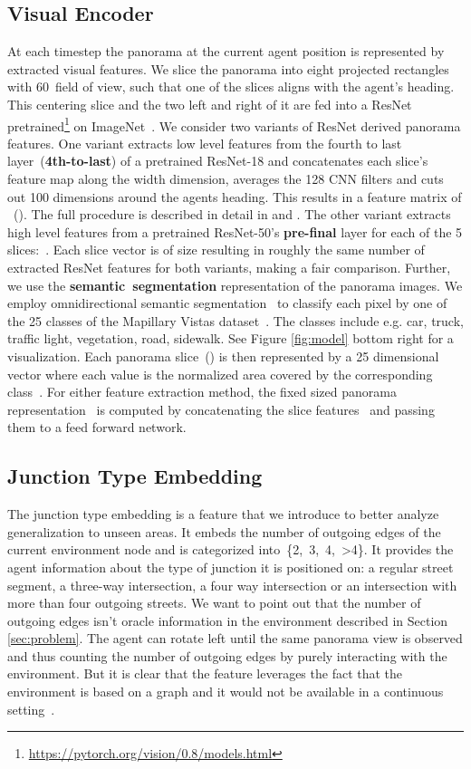 \documentclass[11pt]{article}
\begin{document}
\subsection{Visual Encoder}
At each timestep  the panorama at the current agent position is represented by
extracted visual features. We slice the panorama into eight projected rectangles with 60\degree~field of view, such that one of the slices aligns with the agent's heading. This centering slice and the two left and right of it are fed into a ResNet pretrained\footnote{\url{https://pytorch.org/vision/0.8/models.html}} on ImageNet~\cite{imagenet}. We consider two variants of ResNet derived panorama features. One variant extracts low level features from the fourth to last layer~(\textbf{4th-to-last}) of a pretrained ResNet-18 and concatenates each slice's feature map along the width dimension, averages the 128 CNN filters and cuts out 100 dimensions around the agents heading. This results in a feature matrix of ~(). The full procedure is described in detail in \citet{Chen2018Touchdown} and \citet{Zhu2020MultimodalNavigation}. The other variant extracts high level features from a pretrained \mbox{ResNet-50's} \textbf{pre-final} layer for each of the 5 slices:~. Each slice vector  is of size  resulting in roughly the same number of extracted ResNet features for both variants, making a fair comparison. Further, we use the \textbf{semantic~segmentation} representation of the panorama images. We employ omnidirectional semantic segmentation~\cite{yang2020omnisupervised} to classify each pixel by one of the 25 classes of the Mapillary Vistas dataset~\cite{mapillary}. The classes include e.g. car, truck, traffic light, vegetation, road, sidewalk. See Figure \ref{fig:model} bottom right for a visualization. Each panorama slice~() is then represented by a 25 dimensional vector where each value is the normalized area covered by the corresponding class~\cite{Zhang2020DiagnosingNavigation}. For either feature extraction method, the fixed sized panorama representation~ is computed by concatenating the slice features~ and passing them to a feed forward network.

\subsection{Junction Type Embedding}
\label{sec:junction}
The junction type embedding is a feature that we introduce to better analyze generalization to unseen areas. It embeds the number of outgoing edges of the current environment node and is categorized into~\{2,~3,~4,~\textgreater4\}. It provides the agent information about the type of junction it is positioned on: a regular street segment, a three-way intersection, a four way intersection or an intersection with more than four outgoing streets. We want to point out that the number of outgoing edges isn't oracle information in the environment described in Section \ref{sec:problem}. The agent can rotate left until the same panorama view is observed and thus counting the number of outgoing edges by purely interacting with the environment. But it is clear that the feature leverages the fact that the environment is based on a graph and it would not be available in a continuous setting~\cite{vln_ce}.
\end{document}
